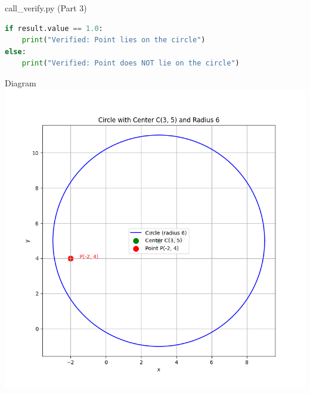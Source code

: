 \documentclass{beamer}
\begin{document}
\begin{frame}[fragile]{call\_verify.py (Part 3)}
\begin{lstlisting}[language=Python]
if result.value == 1.0:
    print("Verified: Point lies on the circle")
else:
    print("Verified: Point does NOT lie on the circle")
\end{lstlisting}
\end{frame}



\begin{frame}{Diagram}
\centering
\includegraphics[width=0.7\linewidth]{Figs/Fig1.png}
\end{frame}
\end{document}

